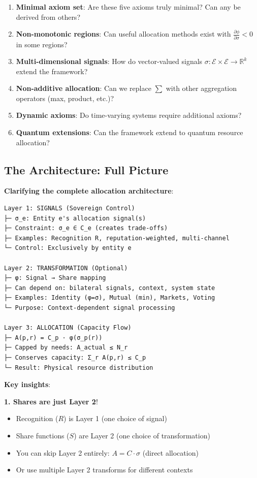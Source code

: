 \documentclass[11pt,a4paper]{article}
\theoremstyle{definition}
\theoremstyle{remark}
\newcommand{\E}{\mathcal{E}}
\begin{document}
\begin{enumerate}
\item \textbf{Minimal axiom set}: Are these five axioms truly minimal? Can any be derived from others?

\item \textbf{Non-monotonic regions}: Can useful allocation methods exist with $\frac{\partial \phi}{\partial \sigma} < 0$ in some regions?

\item \textbf{Multi-dimensional signals}: How do vector-valued signals $\sigma: \E \times \E \to \mathbb{R}^k$ extend the framework?

\item \textbf{Non-additive allocation}: Can we replace $\sum$ with other aggregation operators (max, product, etc.)?

\item \textbf{Dynamic axioms}: Do time-varying systems require additional axioms?

\item \textbf{Quantum extensions}: Can the framework extend to quantum resource allocation?
\end{enumerate}

\subsection{The Architecture: Full Picture}

\textbf{Clarifying the complete allocation architecture}:

\begin{verbatim}
Layer 1: SIGNALS (Sovereign Control)
├─ σ_e: Entity e's allocation signal(s)
├─ Constraint: σ_e ∈ C_e (creates trade-offs)
├─ Examples: Recognition R, reputation-weighted, multi-channel
└─ Control: Exclusively by entity e

Layer 2: TRANSFORMATION (Optional)
├─ φ: Signal → Share mapping
├─ Can depend on: bilateral signals, context, system state
├─ Examples: Identity (φ=σ), Mutual (min), Markets, Voting
└─ Purpose: Context-dependent signal processing

Layer 3: ALLOCATION (Capacity Flow)
├─ A(p,r) = C_p · φ(σ_p(r))
├─ Capped by needs: A_actual ≤ N_r
├─ Conserves capacity: Σ_r A(p,r) ≤ C_p
└─ Result: Physical resource distribution
\end{verbatim}

\textbf{Key insights}:

\textbf{1. Shares are just Layer 2}!
\begin{itemize}
\item Recognition ($R$) is Layer 1 (one choice of signal)
\item Share functions ($S$) are Layer 2 (one choice of transformation)
\item You can skip Layer 2 entirely: $A = C \cdot \sigma$ (direct allocation)
\item Or use multiple Layer 2 transforms for different contexts
\end{itemize}
\end{document}
